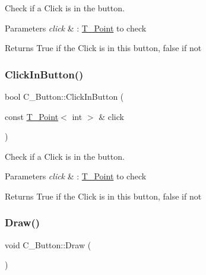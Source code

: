Check if a Click is in the button. 


\begin{DoxyParams}{Parameters}
{\em click} & \+: \hyperlink{classT__Point}{T\+\_\+\+Point} to check \\
\hline
\end{DoxyParams}
\begin{DoxyReturn}{Returns}
True if the Click is in this button, false if not 
\end{DoxyReturn}
\mbox{\label{classC__Button_a805c797b9afdddb5896a516a3e783882}} 
\subsubsection{\texorpdfstring{Click\+In\+Button()}{ClickInButton()}\hspace{0.1cm}{\footnotesize\ttfamily [2/2]}}
{\footnotesize\ttfamily bool C\+\_\+\+Button\+::\+Click\+In\+Button (\begin{DoxyParamCaption}\item[{const \hyperlink{classT__Point}{T\+\_\+\+Point}$<$ int $>$ \&}]{click }\end{DoxyParamCaption})}



Check if a Click is in the button. 


\begin{DoxyParams}{Parameters}
{\em click} & \+: \hyperlink{classT__Point}{T\+\_\+\+Point} to check \\
\hline
\end{DoxyParams}
\begin{DoxyReturn}{Returns}
True if the Click is in this button, false if not 
\end{DoxyReturn}
\mbox{\label{classC__Button_a71f9a7d92a30818af1539104e6b963fb}} 
\subsubsection{\texorpdfstring{Draw()}{Draw()}\hspace{0.1cm}{\footnotesize\ttfamily [1/4]}}
{\footnotesize\ttfamily void C\+\_\+\+Button\+::\+Draw (\begin{DoxyParamCaption}{ }\end{DoxyParamCaption})}



